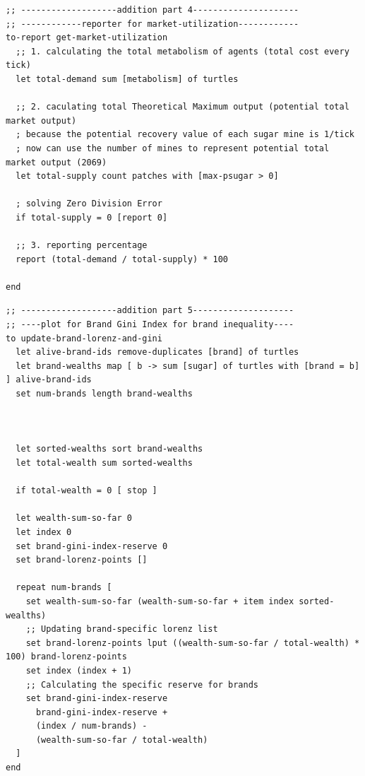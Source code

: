 \documentclass{article}
\begin{document}
\begin{lstlisting}[language=NetLogo, caption={Reporter for market-utilization}]
;; -------------------addition part 4---------------------
;; ------------reporter for market-utilization------------
to-report get-market-utilization
  ;; 1. calculating the total metabolism of agents (total cost every tick)
  let total-demand sum [metabolism] of turtles
  
  ;; 2. caculating total Theoretical Maximum output (potential total market output)
  ; because the potential recovery value of each sugar mine is 1/tick
  ; now can use the number of mines to represent potential total market output (2069)
  let total-supply count patches with [max-psugar > 0]
  
  ; solving Zero Division Error
  if total-supply = 0 [report 0]

  ;; 3. reporting percentage
  report (total-demand / total-supply) * 100

end
\end{lstlisting}


\begin{lstlisting}[language=NetLogo, caption={Reporter for Brand level Gini Index}]
;; -------------------addition part 5--------------------
;; ----plot for Brand Gini Index for brand inequality----
to update-brand-lorenz-and-gini
  let alive-brand-ids remove-duplicates [brand] of turtles
  let brand-wealths map [ b -> sum [sugar] of turtles with [brand = b] ] alive-brand-ids
  set num-brands length brand-wealths
  

  
  let sorted-wealths sort brand-wealths
  let total-wealth sum sorted-wealths
  
  if total-wealth = 0 [ stop ]
  
  let wealth-sum-so-far 0
  let index 0
  set brand-gini-index-reserve 0    
  set brand-lorenz-points []        
  
  repeat num-brands [
    set wealth-sum-so-far (wealth-sum-so-far + item index sorted-wealths)
    ;; Updating brand-specific lorenz list 
    set brand-lorenz-points lput ((wealth-sum-so-far / total-wealth) * 100) brand-lorenz-points
    set index (index + 1)
    ;; Calculating the specific reserve for brands
    set brand-gini-index-reserve
      brand-gini-index-reserve +
      (index / num-brands) -
      (wealth-sum-so-far / total-wealth)
  ]
end
\end{lstlisting}
\end{document}
